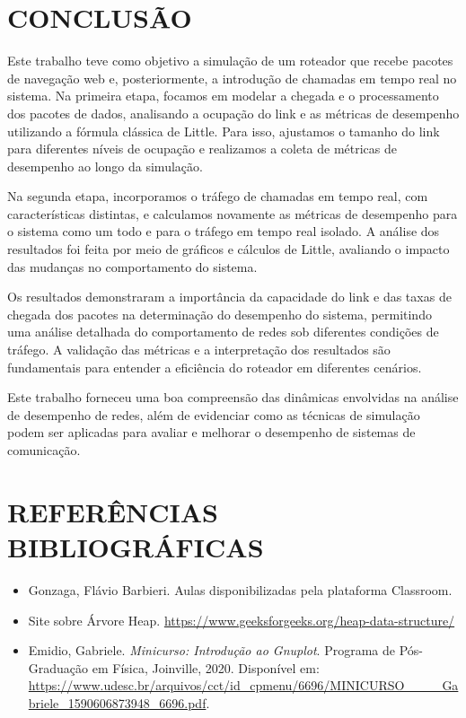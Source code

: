 
\section{CONCLUSÃO}

Este trabalho teve como objetivo a simulação de um roteador que recebe pacotes de navegação web e, posteriormente, a introdução de chamadas em tempo real no sistema. Na primeira etapa, focamos em modelar a chegada e o processamento dos pacotes de dados, analisando a ocupação do link e as métricas de desempenho utilizando a fórmula clássica de Little. Para isso, ajustamos o tamanho do link para diferentes níveis de ocupação e realizamos a coleta de métricas de desempenho ao longo da simulação.

Na segunda etapa, incorporamos o tráfego de chamadas em tempo real, com características distintas, e calculamos novamente as métricas de desempenho para o sistema como um todo e para o tráfego em tempo real isolado. A análise dos resultados foi feita por meio de gráficos e cálculos de Little, avaliando o impacto das mudanças no comportamento do sistema.

Os resultados demonstraram a importância da capacidade do link e das taxas de chegada dos pacotes na determinação do desempenho do sistema, permitindo uma análise detalhada do comportamento de redes sob diferentes condições de tráfego. A validação das métricas e a interpretação dos resultados são fundamentais para entender a eficiência do roteador em diferentes cenários.

Este trabalho forneceu uma boa compreensão das dinâmicas envolvidas na análise de desempenho de redes, além de evidenciar como as técnicas de simulação podem ser aplicadas para avaliar e melhorar o desempenho de sistemas de comunicação.

\section{REFERÊNCIAS BIBLIOGRÁFICAS}

\begin{itemize} 
\item Gonzaga, Flávio Barbieri. Aulas disponibilizadas pela plataforma Classroom. 
\item Site sobre Árvore Heap. \url{https://www.geeksforgeeks.org/heap-data-structure/}
 \item Emidio, Gabriele. \textit{Minicurso: Introdução ao Gnuplot}. Programa de Pós-Graduação em Física, Joinville, 2020. Disponível em: \url{https://www.udesc.br/arquivos/cct/id_cpmenu/6696/MINICURSO____Gabriele_1590606873948_6696.pdf}. 
 \end{itemize}